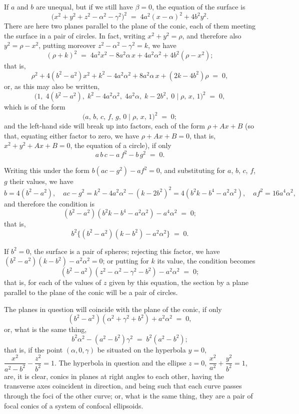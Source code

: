 \documentclass[11pt]{article}
\begin{document}
If $a$ and $b$ are unequal, but if we still have $\beta = 0$, the equation of the surface is
\[
\bigl(x^{2} + y^{2} + z^{2} - \alpha^{2} - \gamma^{2}\bigr)^{2} \;=\; 4 a^{2}(x - \alpha)^{2} + 4 b^{2} y^{2}.
\]
There are here two planes parallel to the plane of the conic, each of them meeting the surface in a pair of circles. In fact, writing $x^{2} + y^{2} = \rho$, and therefore also $y^{2} = \rho - x^{2}$, putting moreover $z^{2} - \alpha^{2} - \gamma^{2} = k$, we have
\[
(\rho + k)^{2} \;=\; 4 a^{2} x^{2} - 8 a^{2}\alpha\,x + 4 a^{2}\alpha^{2} + 4 b^{2}(\rho - x^{2});
\]
that is,
\[
\rho^{2} + 4(b^{2} - a^{2}) x^{2} + k^{2} - 4 a^{2}\alpha^{2} + 8 a^{2}\alpha\,x + (2 k - 4 b^{2})\rho \;=\; 0,
\]
or, as this may also be written,
\[
\bigl(1,\;4(b^{2} - a^{2}),\;k^{2} - 4 a^{2}\alpha^{2},\;4 a^{2}\alpha,\;k - 2 b^{2},\;0 \mid \rho,\,x,\,1\bigr)^{2} \;=\; 0,
\]
which is of the form
\[
\bigl(a,\,b,\,c,\,f,\,g,\,0 \mid \rho,\,x,\,1\bigr)^{2} \;=\; 0;
\]
and the left-hand side will break up into factors, each of the form $\rho + Ax + B$ (so that, equating either factor to zero, we have $\rho + Ax + B = 0$, that is, $x^{2} + y^{2} + Ax + B = 0$, the equation of a circle), if only
\[
a\,b\,c - a\,f^{2} - b\,g^{2} \;=\; 0.
\]

Writing this under the form $b(ac - g^{2}) - a f^{2} = 0$, and substituting for $a$, $b$, $c$, $f$, $g$ their values, we have
\[
b = 4(b^{2} - a^{2}),\quad ac - g^{2} = k^{2} - 4 a^{2}\alpha^{2} - (k - 2 b^{2})^{2} = 4(b^{2} k - b^{4} - a^{2}\alpha^{2}),\quad a f^{2} = 16 a^{4}\alpha^{2},
\]
and therefore the condition is
\[
(b^{2} - a^{2})(b^{2} k - b^{4} - a^{2}\alpha^{2}) - a^{4}\alpha^{2} \;=\; 0;
\]
that is,
\[
b^{2}\bigl\{(b^{2} - a^{2})(k - b^{2}) - a^{2}\alpha^{2}\bigr\} \;=\; 0.
\]

If $b^{2} = 0$, the surface is a pair of spheres; rejecting this factor, we have $(b^{2} - a^{2})(k - b^{2}) - a^{2}\alpha^{2} = 0$; or putting for $k$ its value, the condition becomes
\[
(b^{2} - a^{2})(z^{2} - \alpha^{2} - \gamma^{2} - b^{2}) - a^{2}\alpha^{2} \;=\; 0;
\]
that is, for each of the values of $z$ given by this equation, the section by a plane parallel to the plane of the conic will be a pair of circles.

The planes in question will coincide with the plane of the conic, if only
\[
(b^{2} - a^{2})(\alpha^{2} + \gamma^{2} + b^{2}) + a^{2}\alpha^{2} \;=\; 0,
\]
or, what is the same thing,
\[
b^{2}\alpha^{2} - (a^{2} - b^{2})\gamma^{2} \;=\; b^{2}(a^{2} - b^{2});
\]
that is, if the point $(\alpha, 0, \gamma)$ be situated on the hyperbola $y = 0$, $\dfrac{x^{2}}{a^{2} - b^{2}} - \dfrac{z^{2}}{b^{2}} = 1$. The hyperbola in question and the ellipse $z = 0$, $\dfrac{x^{2}}{a^{2}} + \dfrac{y^{2}}{b^{2}} = 1$, are, it is clear, conics in planes at right angles to each other, having the transverse axes coincident in direction, and being such that each curve passes through the foci of the other curve; or, what is the same thing, they are a pair of focal conics of a system of confocal ellipsoids.
\end{document}
